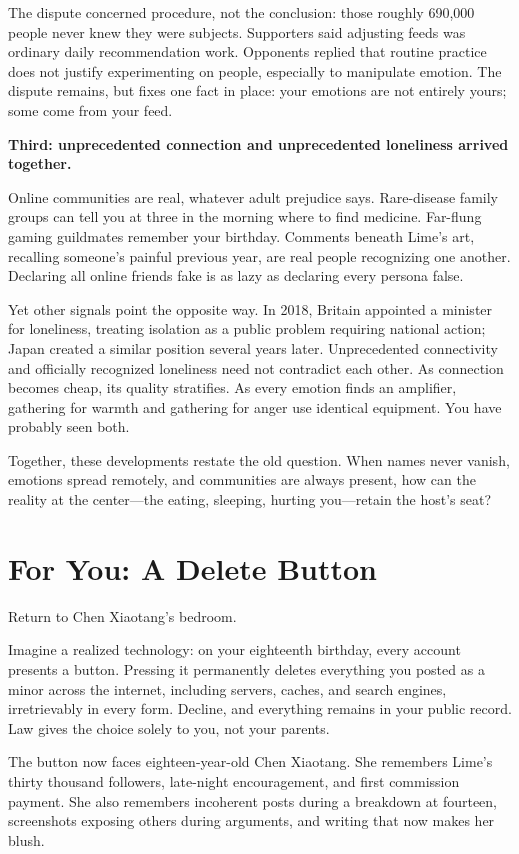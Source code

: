 The dispute concerned procedure, not the conclusion: those roughly 690,000 people never knew they were subjects. Supporters said adjusting feeds was ordinary daily recommendation work. Opponents replied that routine practice does not justify experimenting on people, especially to manipulate emotion. The dispute remains, but fixes one fact in place: your emotions are not entirely yours; some come from your feed.

\textbf{Third: unprecedented connection and unprecedented loneliness arrived together.}

Online communities are real, whatever adult prejudice says. Rare-disease family groups can tell you at three in the morning where to find medicine. Far-flung gaming guildmates remember your birthday. Comments beneath Lime's art, recalling someone's painful previous year, are real people recognizing one another. Declaring all online friends fake is as lazy as declaring every persona false.

Yet other signals point the opposite way. In 2018, Britain appointed a minister for loneliness, treating isolation as a public problem requiring national action; Japan created a similar position several years later. Unprecedented connectivity and officially recognized loneliness need not contradict each other. As connection becomes cheap, its quality stratifies. As every emotion finds an amplifier, gathering for warmth and gathering for anger use identical equipment. You have probably seen both.

Together, these developments restate the old question. When names never vanish, emotions spread remotely, and communities are always present, how can the reality at the center---the eating, sleeping, hurting you---retain the host's seat?

\section{For You: A Delete Button}
Return to Chen Xiaotang's bedroom.

Imagine a realized technology: on your eighteenth birthday, every account presents a button. Pressing it permanently deletes everything you posted as a minor across the internet, including servers, caches, and search engines, irretrievably in every form. Decline, and everything remains in your public record. Law gives the choice solely to you, not your parents.

The button now faces eighteen-year-old Chen Xiaotang. She remembers Lime's thirty thousand followers, late-night encouragement, and first commission payment. She also remembers incoherent posts during a breakdown at fourteen, screenshots exposing others during arguments, and writing that now makes her blush.

